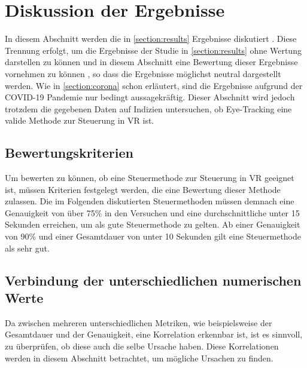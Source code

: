 
\chapter{Diskussion der Ergebnisse}
\label{section:discussion}
In diesem Abschnitt werden die in \autoref{section:results} Ergebnisse diskutiert . Diese Trennung erfolgt, um die Ergebnisse der Studie in \autoref{section:results} ohne Wertung darstellen zu können und in diesem Abschnitt eine Bewertung dieser Ergebnisse  vornehmen zu können , so dass die Ergebnisse möglichst neutral dargestellt werden. Wie in \autoref{section:corona} schon erläutert, sind die Ergebnisse aufgrund der COVID-19 Pandemie nur bedingt aussagekräftig. Dieser Abschnitt wird jedoch trotzdem die gegebenen Daten auf Indizien untersuchen, ob Eye-Tracking eine valide Methode zur Steuerung in VR ist. 

\section{Bewertungskriterien}
\label{section:criteria}
Um bewerten zu können, ob eine Steuermethode zur Steuerung in VR geeignet ist, müssen Kriterien festgelegt werden, die eine Bewertung dieser Methode zulassen. Die im Folgenden diskutierten Steuermethoden müssen demnach eine Genauigkeit von über 75\% in den Versuchen und eine durchschnittliche unter 15 Sekunden erreichen, um als gute Steuermethode zu gelten. Ab einer Genauigkeit von 90\% und einer Gesamtdauer von unter 10 Sekunden gilt eine Steuermethode als sehr gut. 

\section{Verbindung der unterschiedlichen numerischen Werte}
Da zwischen mehreren unterschiedlichen Metriken, wie beispielsweise der Gesamtdauer und der Genauigkeit, eine Korrelation erkennbar ist, ist es sinnvoll, zu überprüfen, ob diese auch die selbe Ursache haben. Diese Korrelationen werden in diesem Abschnitt betrachtet, um mögliche Ursachen zu finden.

